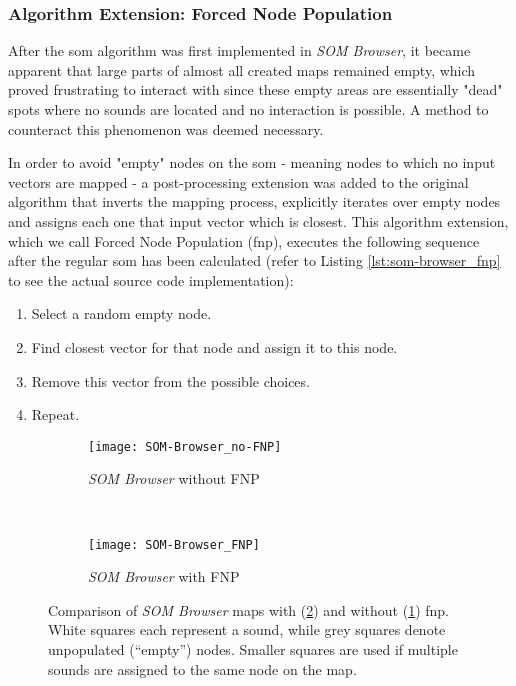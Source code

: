 \subsubsection{Algorithm Extension: Forced Node Population}
\label{subsubsec:som_forced_population}

After the \gls{som} algorithm was first implemented in \textit{SOM Browser}, it
became apparent that large parts of almost all created maps remained empty,
which proved frustrating to interact with since these empty areas are
essentially "dead" spots where no sounds are located and no interaction is
possible. A method to counteract this phenomenon was deemed necessary.

\smallskip

In order to avoid "empty" nodes on the \gls{som} - meaning nodes to which no
input vectors are mapped - a post-processing extension was added to the original
algorithm that inverts the mapping process, explicitly iterates over empty nodes
and assigns each one that input vector which is closest. This algorithm
extension, which we call Forced Node Population (\gls{fnp}), executes the
following sequence after the regular \gls{som} has been calculated (refer to
Listing \ref{lst:som-browser_fnp} to see the actual source code implementation):

\begin{enumerate}
  \item Select a random empty node.
  \item Find closest vector for that node and assign it to this node.
  \item Remove this vector from the possible choices.
  \item Repeat.
\end{enumerate}

\begin{figure}[!htb]
  \centering
\begin{subfigure}{0.38\textwidth}
  \centering
  \texttt{[image: SOM-Browser\_no-FNP]}
  \caption{\textit{SOM Browser} without FNP}
  \label{fig:som-browser_no_fnp}
\end{subfigure}
~
\begin{subfigure}{0.38\textwidth}
  \centering
  \texttt{[image: SOM-Browser\_FNP]}
  \caption{\textit{SOM Browser} with FNP}
  \label{fig:som-browser_fnp}
\end{subfigure}
\caption[Comparison of maps with (\ref{fig:som-browser_fnp}) and without
(\ref{fig:som-browser_no_fnp}) \gls{fnp}]
{Comparison of \textit{SOM Browser} maps with (\ref{fig:som-browser_fnp}) and
without (\ref{fig:som-browser_no_fnp}) \gls{fnp}. White squares each represent
a sound, while grey squares denote unpopulated (``empty'') nodes. Smaller
squares are used if multiple sounds are assigned to the same node on the map.}
\label{fig:som-browser_fnp_comparison}
\end{figure}

